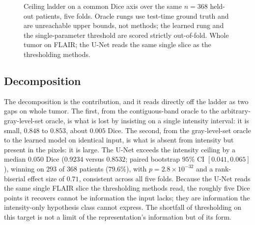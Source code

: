 \begin{table}[t]
  \caption{Ceiling ladder on a common Dice axis over the same held-out patients.
  Class C rows \emph{use test-time ground truth} (unreachable bounds, not
  methods); Class B rows are scored strictly out-of-fold under patient-level
  cross-validation. Both targets appear: the intensity ceiling
  (\texttt{oracle\_levelset}) is $0.853$ on whole tumor and $0.635$ on enhancing
  tumor.}
  \label{tab:ceiling}
  \centering
\end{table}

\begin{figure}[t]
  \centering
  \caption{Ceiling ladder on a common Dice axis over the same $n=368$ held-out
  patients, five folds. Oracle rungs use test-time ground truth and are
  unreachable upper bounds, not methods; the learned rung and the
  single-parameter threshold are scored strictly out-of-fold. Whole tumor on
  FLAIR; the U-Net reads the same single slice as the thresholding methods.}
  \label{fig:ladder}
\end{figure}

\subsection{Decomposition}

The decomposition is the contribution, and it reads directly off the ladder as
two gaps on whole tumor. The first, from the contiguous-band oracle to the
arbitrary-gray-level-set oracle, is what is lost by insisting on a single
intensity interval: it is small, $0.848$ to $0.853$, about $0.005$ Dice. The
second, from the gray-level-set oracle to the learned model on identical input,
is what is absent from intensity but present in the pixels: it is large. The
U-Net exceeds the intensity ceiling by a median $0.050$ Dice ($0.9234$ versus
$0.8532$; paired bootstrap $95\%$ CI $[0.041, 0.065]$), winning on $293$ of $368$
patients ($79.6\%$), with $p = 2.8\times10^{-32}$ and a rank-biserial effect size
of $0.71$, consistent across all five folds. Because the U-Net reads the same
single FLAIR slice the thresholding methods read, the roughly five Dice points it
recovers cannot be information the input lacks; they are information the
intensity-only hypothesis class cannot express. The shortfall of thresholding on
this target is not a limit of the representation's information but of its
form.


